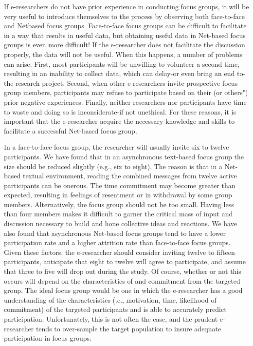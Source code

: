 \documentclass{beamer}
\begin{document}
    \begin{frame}
    
If e-researchers do not have prior experience in conducting focus groups, it will be very useful to introduce themselves to the process by observing both face-to-face and Netbased focus groups. Face-to-face focus groups can be difficult to facilitate in a way that results in useful data, but obtaining useful data in Net-based focus groups is even more difficult! If the e-researcher does not facilitate the discussion properly, the data will not be useful. When this happens, a number of problems can arise. First, most participants will be unwilling to volunteer a second time, resulting in an inability to collect data, which can delay-or even bring an end to-the research project. Second, when other e-researchers invite prospective focus group members, participants may refuse to participate based on their (or others") prior negative experiences. Finally, neither researchers nor participants have time to waste and doing so is inconsiderate-if not unethical. For these reasons, it is important that the e-researcher acquire the necessary knowledge and skills to facilitate a successful Net-based focus group.


  \end{frame}
  
    \begin{frame}
  
In a face-to-face focus group, the researcher will usually invite six to twelve participants. We have found that in an asynchronous text-based focus group the size should
be reduced slightly (e.g., six to eight). The reason is that in a Net-based textual environment, reading the combined messages from twelve active participants can be onerous. The time commitment may become greater than expected, resulting in feelings of resentment or in withdrawal by some group members. Alternatively, the focus group should not be too small. Having less than four members makes it difficult to garner the critical mass of input and discussion necessary to build and hone collective ideas and reactions. We have also found that asynchronous Net-based focus groups tend to have a lower participation rate and a higher attrition rate than face-to-face focus groups. Given these factors, the e-researcher should consider inviting twelve to fifteen participants, anticipate that eight to twelve will agree to participate, and assume that three to five will drop out during the study. Of course, whether or not this occurs will depend on the characteristics of and commitment from the targeted group. The ideal focus group would be one in which the e-researcher has a good understanding of the characteristics (.e., motivation, time, likelihood of commitment) of the targeted participants and is able to accurately predict participation. Unfortunately, this is not often the case, and the prudent e-researcher tends to over-sample the target population to insure adequate participation in focus groups.


  \end{frame}
  
\end{document}
